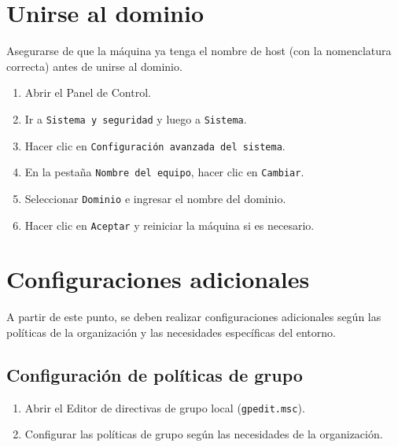 \documentclass[11pt]{article}
\begin{document}
    \section{Unirse al dominio}
    \begin{tcolorbox}[important]
        Asegurarse de que la máquina ya tenga el nombre de host (con la nomenclatura correcta) antes de unirse al dominio.
    \end{tcolorbox}
    \begin{enumerate}
        \item Abrir el Panel de Control.
        \item Ir a \texttt{Sistema y seguridad} y luego a \texttt{Sistema}.
        \item Hacer clic en \texttt{Configuración avanzada del sistema}.
        \item En la pestaña \texttt{Nombre del equipo}, hacer clic en \texttt{Cambiar}.
        \item Seleccionar \texttt{Dominio} e ingresar el nombre del dominio.
        \item Hacer clic en \texttt{Aceptar} y reiniciar la máquina si es necesario.
    \end{enumerate}

    \section{Configuraciones adicionales}
    A partir de este punto, se deben realizar configuraciones adicionales según las políticas de la organización y las necesidades específicas del entorno.

    \subsection{Configuración de políticas de grupo}
    \begin{enumerate}
        \item Abrir el Editor de directivas de grupo local (\texttt{gpedit.msc}).
        \item Configurar las políticas de grupo según las necesidades de la organización.
    \end{enumerate}
\end{document}
